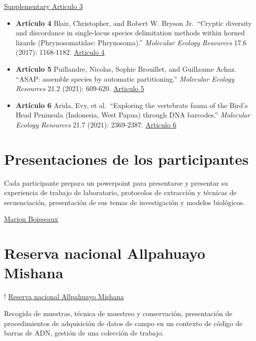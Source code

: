 \documentclass[
]{book}
\begin{document}
\href{articulos/articulo3_90004204-sup-0001-SupInfo.pdf}{Supplementary Articulo 3}

\begin{itemize}
\item
  \textbf{Artículo 4} Blair, Christopher, and Robert W. Bryson Jr.~``Cryptic diversity and discordance in single-locus species delimitation methods within horned lizards (Phrynosomatidae: Phrynosoma).'' \emph{Molecular Ecology Resources} 17.6 (2017): 1168-1182. \href{articulos/Articulo_4-Blair_et_al_2017.pdf}{Articulo 4}
\item
  \textbf{Artículo 5} Puillandre, Nicolas, Sophie Brouillet, and Guillaume Achaz. ``ASAP: assemble species by automatic partitioning.'' \emph{Molecular Ecology Resources} 21.2 (2021): 609-620. \href{articulos/Articulo_5-Puillandre_et_al_2020.pdf}{Articulo 5}
\item
  \textbf{Artículo 6} Arida, Evy, et al.~``Exploring the vertebrate fauna of the Bird's Head Peninsula (Indonesia, West Papua) through DNA barcodes.'' \emph{Molecular Ecology Resources} 21.7 (2021): 2369-2387. \href{articulos/Articulo_6-Arida_et_al_2021.pdf}{Articulo 6}
\end{itemize}

\hypertarget{presentaciones-de-los-participantes}{%
\section{Presentaciones de los participantes}\label{presentaciones-de-los-participantes}}

Cada participante prepara un powerpoint para presentarse y presentar su experiencia de trabajo de laboratorio, protocolos de extracción y técnicas de secuenciación, presentación de sus temas de investigación y
modelos biológicos.

\href{presentaciones_participantes/MBoisseaux.pdf}{Marion Boisseaux}

\hypertarget{reserva-nacional-allpahuayo-mishana}{%
\section{Reserva nacional Allpahuayo Mishana}\label{reserva-nacional-allpahuayo-mishana}}

! \href{photos/20240829_070712.jpg}{Reserva nacional Allpahuayo Mishana}

Recogida de muestras, técnica de muestreo y conservación, presentación de procedimientos de adquisición de datos de campo en un contexto de código de barras de ADN, gestión de una colección de trabajo.
\end{document}
